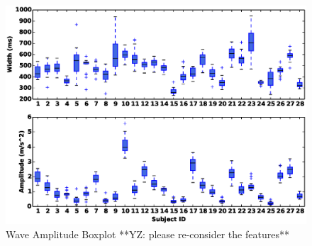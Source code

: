 \begin{figure}
\includegraphics[width=\columnwidth]{figure/width_amp_box.eps}
\centering
\caption{\label{fig:width_amp} Wave Amplitude Boxplot **YZ: please re-consider the features**}
\end{figure}

